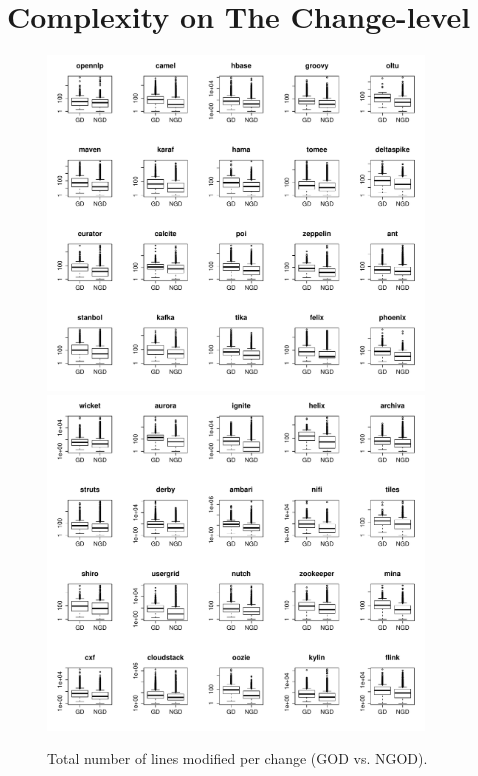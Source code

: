 \chapter{Complexity on The Change-level}
\begin{figure}[tb]
	\centering
	\includegraphics[width=100mm]{figures/chapter4/rq3_god_churn_logged_1}
	\includegraphics[width=100mm]{figures/chapter4/rq3_god_churn_logged_2}
	\caption{Total number of lines modified per change (GOD vs. NGOD).}
	\label{figure:total_number_of_lines_changed_god_vs_ngod}
\end{figure}


